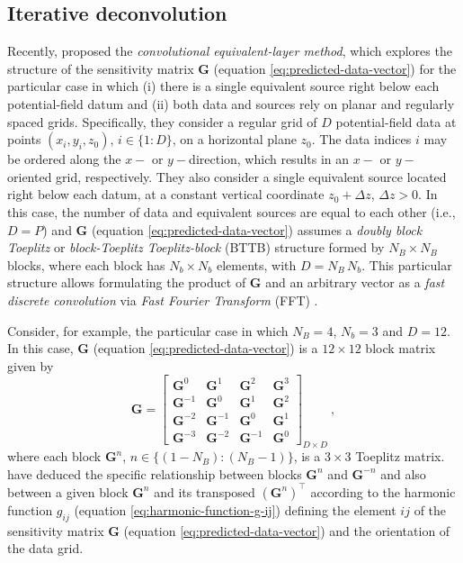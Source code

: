 \subsection{Iterative deconvolution}

Recently, \citet{takahashi-etal2020,takahashi-etal2022} proposed the \textit{convolutional equivalent-layer method}, 
which explores the structure of the sensitivity matrix $\mathbf{G}$ (equation \ref{eq:predicted-data-vector}) for 
the particular case in which (i) there is a single equivalent source right below each potential-field
datum and (ii) both data and sources rely on planar and regularly spaced grids.
Specifically, they consider a regular grid of $D$ 
potential-field data at points $(x_{i}, y_{i}, z_{0})$, $i \in \{1:D\}$, on a horizontal plane $z_{0}$.
The data indices $i$ may be ordered along the $x-$ or $y-$direction, which results in an
$x-$ or $y-$oriented grid, respectively.
They also consider a single equivalent source located right below each datum, at a constant vertical coordinate
$z_{0} + \Delta z$, $\Delta z > 0$.
In this case, the number of data and equivalent sources are equal to each other (i.e., $D = P$) and
$\mathbf{G}$ (equation \ref{eq:predicted-data-vector}) assumes a \textit{doubly block Toeplitz} \cite[][p. 28]{jain1989} or 
\textit{block-Toeplitz Toeplitz-block} (BTTB) \cite[][p. 67]{chan-jin2007} structure formed by $N_{B} \times N_{B}$
blocks, where each block has $N_{b} \times N_{b}$ elements, with $D = N_{B} \, N_{b}$.
This particular structure allows formulating the product
of $\mathbf{G}$ and an arbitrary vector as a \textit{fast discrete convolution} via 
\textit{Fast Fourier Transform} (FFT) \cite[][section 4.2]{vanloan1992}.

Consider, for example, the particular case in which $N_{B} = 4$, $N_{b} = 3$ and $D = 12$. In this case,
$\mathbf{G}$ (equation \ref{eq:predicted-data-vector}) is a $12 \times 12$ block matrix given by
\begin{equation}
	\mathbf{G} = \begin{bmatrix}
		\mathbf{G}^{0} & \mathbf{G}^{1} & \mathbf{G}^{2} & \mathbf{G}^{3} \\
		\mathbf{G}^{-1} & \mathbf{G}^{0} & \mathbf{G}^{1} & \mathbf{G}^{2} \\
		\mathbf{G}^{-2} & \mathbf{G}^{-1} & \mathbf{G}^{0} & \mathbf{G}^{1} \\
		\mathbf{G}^{-3} & \mathbf{G}^{-2} & \mathbf{G}^{-1} & \mathbf{G}^{0}
	\end{bmatrix}_{D \times D} \: ,
	\label{eq:matrix-G-BTTB}
\end{equation}
where each block $\mathbf{G}^{n}$, $n \in \{ (1 - N_{B}) : (N_{B} - 1) \}$, is a $3 \times 3$ Toeplitz matrix.
\citet{takahashi-etal2020, takahashi-etal2022} have deduced the specific relationship between blocks $\mathbf{G}^{n}$
and $\mathbf{G}^{-n}$ and also between a given block $\mathbf{G}^{n}$ and its transposed $\left(\mathbf{G}^{n}\right)^{\top}$
according to the harmonic function $g_{ij}$ (equation \ref{eq:harmonic-function-g-ij}) defining the element $ij$ of
the sensitivity matrix $\mathbf{G}$ (equation \ref{eq:predicted-data-vector}) and the orientation of the data grid.


